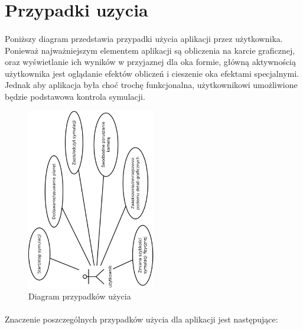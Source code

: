 \section{Przypadki uzycia}\label{sec:usecase}

\paragraph{}

Poniższy diagram przedstawia przypadki użycia aplikacji przez użytkownika. Ponieważ najważniejszym elementem aplikacji są obliczenia na karcie graficznej, oraz wyświetlanie ich wyników w przyjaznej dla oka formie, główną aktywnością użytkownika jest oglądanie efektów obliczeń i cieszenie oka efektami specjalnymi. Jednak aby aplikacja była choć trochę funkcjonalna, użytkownikowi umożliwione będzie podstawowa kontrola symulacji.

\begin{figure}[h]
	\centering
	\includegraphics[width=0.5\textwidth,angle=-90]{use-case.pdf}
	\caption{Diagram przypadków użycia}
	\label{fig:use-case}
\end{figure}

\paragraph{}

Znaczenie poszczególnych przypadków użycia dla aplikacji jest następujące:

